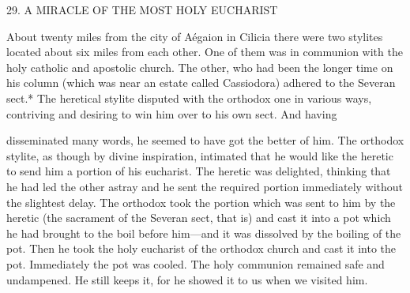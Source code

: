 29.
A MIRACLE OF THE MOST HOLY EUCHARIST

About twenty miles from the city of Aégaion in Cilicia there were
two stylites located about six miles from each other.
One of them
was in communion with the holy catholic and apostolic church.
The
other, who had been the longer time on his column (which was near
an estate called Cassiodora) adhered to the Severan sect.* The
heretical stylite disputed with the orthodox one in various ways,
contriving and desiring to win him over to his own sect.
And having

disseminated many words, he seemed to have got the better of him.
The orthodox stylite, as though by divine inspiration, intimated that
he would like the heretic to send him a portion of his eucharist.
The
heretic was delighted, thinking that he had led the other astray and
he sent the required portion immediately without the slightest delay.
The orthodox took the portion which was sent to him by the heretic
(the sacrament of the Severan sect, that is) and cast it into a pot
which he had brought to the boil before him—and it was dissolved
by the boiling of the pot.
Then he took the holy eucharist of the
orthodox church and cast it into the pot.
Immediately the pot was
cooled.
The holy communion remained safe and undampened.
He
still keeps it, for he showed it to us when we visited him.


